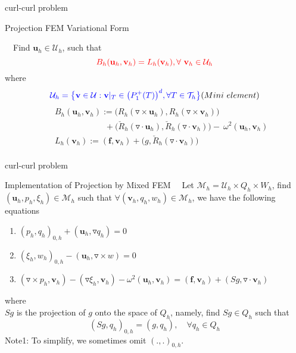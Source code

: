 \documentclass[13pt]{beamer}
\begin{document}
\begin{frame}[t]{curl-curl problem}
   \begin{block}{Projection FEM Variational Form}

     $\quad$Find $\mathbf{u}_h\in\mathcal{U}_h$, such that 
     \begin{equation}{\color{red}B_h(\mathbf{u}_h,\mathbf{v}_h) = L_h(\mathbf{v}_h), \forall\ \mathbf{v}_h\in\mathcal{U}_h}\end{equation} 
     where
     \[{\color{blue}\mathcal{U}_h = \big\{\mathbf{v}\in \mathcal{U}: \mathbf{v}|_T\in\big(P_{1}^{+}(T)\big)^d, \forall T\in \mathcal{T}_h\big\}} (Mini\ element)\]
     \begin{eqnarray}
         \nonumber
         &&B_h(\mathbf{u}_h,\mathbf{v}_h) := \big(R_h(\triangledown\times\mathbf{u}_h),R_h(\triangledown\times\mathbf{v}_h)\big) \\ \nonumber
         &&\qquad\qquad\qquad + \big(\breve{R}_h(\triangledown\cdot\mathbf{u}_h),\breve{R}_h(\triangledown\cdot\mathbf{v}_h)\big) - \
         \omega^2(\mathbf{u}_h,\mathbf{v}_h)  \\ \nonumber
         &&L_h(\mathbf{v}_h) := (\mathbf{f},\mathbf{v}_h) + \big(g,\breve{R}_h(\triangledown\cdot\mathbf{v}_h)\big) \\ \nonumber
     \end{eqnarray}
   \end{block}
   
\end{frame}

\begin{frame}[t]{curl-curl problem}
  \begin{block}{Implementation of Projection by Mixed FEM}
    $\quad$Let $\mathcal{M}_h = \mathcal{U}_h\times Q_h\times W_h$, find $(\mathbf{u}_h,p_h,\xi_h)\in\mathcal{M}_h$ such that $\forall(\mathbf{v}_h,q_h,w_h)\in\mathcal{M}_h$, we have the following equations
    \qquad\begin{enumerate}
      \item $(p_h,q_h)_{0,h} + (\mathbf{u}_h,\triangledown q_h) = 0$ 
      \item $(\xi_h,w_h)_{0,h} - (\mathbf{u}_h,\triangledown\times w) = 0$
      \item $(\triangledown\times p_h,\mathbf{v}_h) - (\triangledown \xi_h,\mathbf{v}_h) -\omega^2(\mathbf{u}_h,\mathbf{v}_h) = ( \mathbf{f},\mathbf{v}_h) + (Sg,\triangledown\cdot\mathbf{v}_h) $
    \end{enumerate} 
  where \\
  \qquad$Sg$ is the projection of $g$ onto the space of $Q_h$, namely, find $Sg\in Q_h$ such that \\[-2ex] 
  \[(Sg,q_h)_{0,h} = (g,q_h),\quad \forall q_h\in Q_h\]
  Note1: To simplify, we sometimes omit $(.,.)_{0,h}.$
  \end{block} 
\end{frame}
\end{document}
